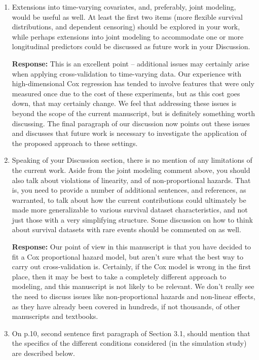 \documentclass{article}
\newcommand{\re}{\textbf{Response: }}
\begin{document}
\begin{enumerate}[align = left]
\item Extensions into time-varying covariates, and, preferably, joint modeling, would be useful as well. At least the first two items (more flexible survival distributions, and dependent censoring) should be explored in your work, while perhaps extensions into joint modeling to accommodate one or more longitudinal predictors could be discussed as future work in your Discussion.
  
\re This is an excellent point -- additional issues may certainly arise when applying cross-validation to time-varying data. Our experience with high-dimensional Cox regression has tended to involve features that were only measured once due to the cost of these experiments, but as this cost goes down, that may certainly change. We feel that addressing these issues is beyond the scope of the current manuscript, but is definitely something worth discussing. The final paragraph of our discussion now points out these issues and discusses that future work is necessary to investigate the application of the proposed approach to these settings.

\item \label{limitations} Speaking of your Discussion section, there is no mention of any limitations of the current work. Aside from the joint modeling comment above, you should also talk about violations of linearity, and of non-proportional hazards. That is, you need to provide a number of additional sentences, and references, as warranted, to talk about how the current contributions could ultimately be made more generalizable to various survival dataset characteristics, and not just those with a very simplifying structure. Some discussion on how to think about survival datasets with rare events should be commented on as well.

  \re Our point of view in this manuscript is that you have decided to fit a Cox proportional hazard model, but aren't sure what the best way to carry out cross-validation is. Certainly, if the Cox model is wrong in the first place, then it may be best to take a completely different approach to modeling, and this manuscript is not likely to be relevant. We don't really see the need to discuss issues like non-proportional hazards and non-linear effects, as they have already been covered in hundreds, if not thousands, of other manuscripts and textbooks.

\item On p.10, second sentence first paragraph of Section 3.1, should mention that the specifics of the different conditions considered (in the simulation study) are described below.


\end{enumerate}
\end{document}
